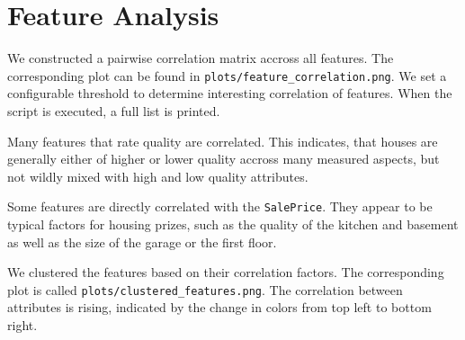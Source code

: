 \section{Feature Analysis}

We constructed a pairwise correlation matrix accross all features. The corresponding plot can be found in \texttt{plots/feature\_correlation.png}. We set a configurable threshold to determine interesting correlation of features. When the script is executed, a full list is printed.

Many features that rate quality are correlated. This indicates, that houses are generally either of higher or lower quality accross many measured aspects, but not wildly mixed with high and low quality attributes.

Some features are directly correlated with the \texttt{SalePrice}. They appear to be typical factors for housing prizes, such as the quality of the kitchen and basement as well as the size of the garage or the first floor.

We clustered the features based on their correlation factors. The corresponding plot is called \texttt{plots/clustered\_features.png}. The correlation between attributes is rising, indicated by the change in colors from top left to bottom right.